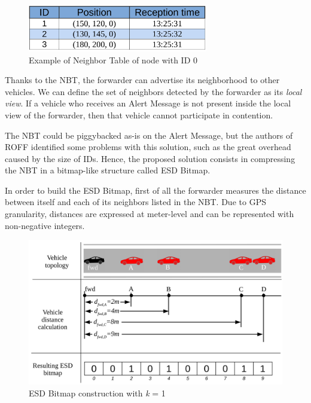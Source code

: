 			\begin{figure}[H]
				\centering
				\includegraphics[width=0.7\textwidth]{immagini/nbt}
				\caption{Example of Neighbor Table of node with ID 0}
				\label{fig:nbt}
			\end{figure}
			Thanks to the NBT, the forwarder can advertise its neighborhood to other vehicles. We can define the set of neighbors detected by the forwarder as its \textit{local view}. If a vehicle who receives an Alert Message is not present inside the local view of the forwarder, then that vehicle cannot participate in contention.
			
			
			The NBT could be piggybacked as-is on the Alert Message, but the authors of ROFF identified some problems with this solution, such as the great overhead caused by the size of IDs. Hence, the proposed solution consists in compressing the NBT in a bitmap-like structure called ESD Bitmap. 
			
			
			In order to build the ESD Bitmap, first of all the forwarder measures the distance between itself and each of its neighbors listed in the NBT. Due to GPS granularity, distances are expressed at meter-level and can be represented with non-negative integers.
			
			\begin{figure}[H]
				\centering
				\includegraphics[width=\textwidth]{immagini/esdBitmapConstruction}
				\caption{ESD Bitmap construction with \textit{k} = 1}
				\label{fig:esdBitmapConstruction}
			\end{figure}
			

